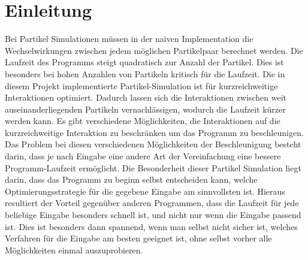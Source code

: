 \documentclass[
	12pt,
	a4paper,
	BCOR10mm,
	DIV14,
	headsepline,
]{scrreprt}
\begin{document}
\chapter{Einleitung}
\label{Einleitung}
Bei Partikel Simulationen müssen in der naiven Implementation die Wechselwirkungen zwischen jedem möglichen Partikelpaar berechnet werden. Die Laufzeit des Programms steigt quadratisch zur Anzahl der Partikel. Dies ist besonders bei hohen Anzahlen von Partikeln kritisch für die Laufzeit. Die in diesem Projekt implementierte Partikel-Simulation ist für kurzreichweitige Interaktionen optimiert. Dadurch lassen sich die Interaktionen zwischen weit auseinanderliegenden Partikeln vernachlässigen, wodurch die Laufzeit kürzer werden kann. Es gibt verschiedene Möglichkeiten, die Interaktionen auf die kurzreichweitige Interaktion zu beschränken um das Programm zu beschleunigen. Das Problem bei diesen verschiedenen Möglichkeiten der Beschleunigung besteht darin, dass je nach Eingabe eine andere Art der Vereinfachung eine bessere Programm-Laufzeit ermöglicht. Die Besonderheit dieser Partikel Simulation liegt darin, dass das Programm zu beginn selbst entscheiden kann, welche Optimierungsstrategie für die gegebene Eingabe am sinnvollsten ist. Hieraus resultiert der Vorteil gegenüber anderen Programmen, dass die Laufzeit für jede beliebige Eingabe besonders schnell ist, und nicht nur wenn die Eingabe passend ist. Dies ist besonders dann spannend, wenn man selbst nicht sicher ist, welches Verfahren für die Eingabe am besten geeignet ist, ohne selbst vorher alle Möglichkeiten einmal auszuprobieren.
\end{document}

